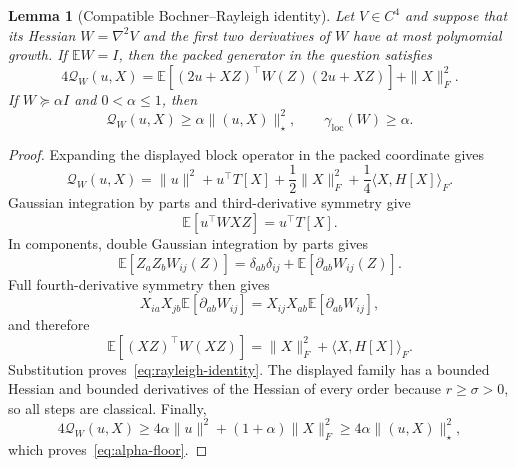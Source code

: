 \documentclass[11pt]{article}
\numberwithin{equation}{section}
\newtheorem{lemma}[theorem]{Lemma}
\newcommand{\E}{\mathbb E}
\newcommand{\loc}{\mathrm{loc}}
\begin{document}
\begin{lemma}[Compatible Bochner--Rayleigh identity]\label{lem:rayleigh}
Let $V\in C^4$ and suppose that its Hessian $W=\nabla^2V$ and the first two
derivatives of $W$ have at most polynomial growth.  If $\E W=I$, then the
packed generator in the question satisfies
\begin{equation}\label{eq:rayleigh-identity}
 4\mathcal Q_W(u,X)
 =\E[(2u+XZ)^\top W(Z)(2u+XZ)]+\|X\|_F^2.
\end{equation}
If $W\succeq\alpha I$ and $0<\alpha\le1$, then
\begin{equation}\label{eq:alpha-floor}
 \mathcal Q_W(u,X)\ge\alpha\|(u,X)\|_\star^2,\qquad
 \gamma_{\loc}(W)\ge\alpha.
\end{equation}
\end{lemma}

\begin{proof}
Expanding the displayed block operator in the packed coordinate gives
\[
 \mathcal Q_W(u,X)=\|u\|^2+u^\top T[X]
 +\frac12\|X\|_F^2+\frac14\langle X,H[X]\rangle_F.
\]
Gaussian integration by parts and third-derivative symmetry give
\[
 \E[u^\top W XZ]=u^\top T[X].
\]
In components, double Gaussian integration by parts gives
\[
 \E[Z_aZ_bW_{ij}(Z)]
 =\delta_{ab}\delta_{ij}+\E[\partial_{ab}W_{ij}(Z)].
\]
Full fourth-derivative symmetry then gives
\[
 X_{ia}X_{jb}\E[\partial_{ab}W_{ij}]
 =X_{ij}X_{ab}\E[\partial_{ab}W_{ij}],
\]
and therefore
\[
 \E[(XZ)^\top W(XZ)]
 =\|X\|_F^2+\langle X,H[X]\rangle_F.
\]
Substitution proves~\eqref{eq:rayleigh-identity}.  The displayed family has a
bounded Hessian and bounded derivatives of the Hessian of every order because
$r\ge\sigma>0$, so all steps are classical.  Finally,
\[
 4\mathcal Q_W(u,X)
 \ge4\alpha\|u\|^2+(1+\alpha)\|X\|_F^2
 \ge4\alpha\|(u,X)\|_\star^2,
\]
which proves~\eqref{eq:alpha-floor}.
\end{proof}
\end{document}
